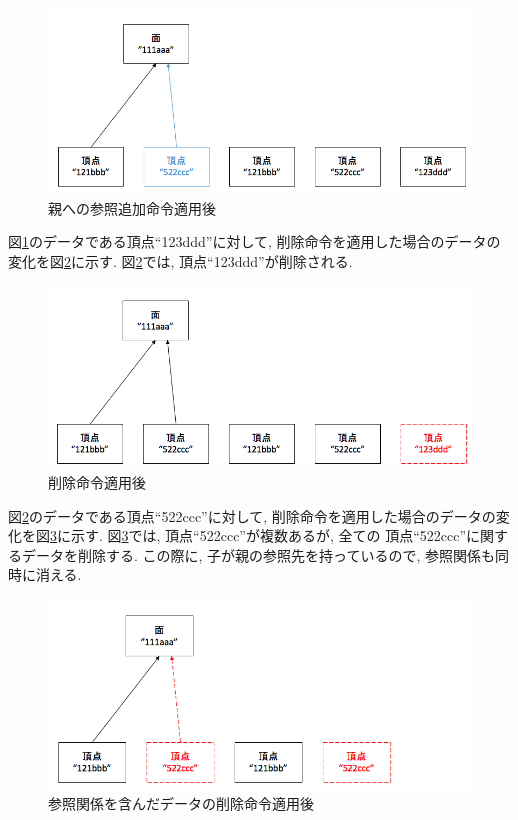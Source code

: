 \begin{figure}[htbp]
  \begin{center}
    \includegraphics[scale=0.45]{images/ope2}
    \caption{親への参照追加命令適用後}
    \label{命令2}
  \end{center}
\end{figure}
図\ref{命令2}のデータである頂点``123ddd''に対して, 削除命令を適用した場合のデータの変化を図\ref{命令3}に示す. 図\ref{命令3}では, 頂点``123ddd''が削除される.
\begin{figure}[htbp]
  \begin{center}
    \includegraphics[scale=0.45]{images/ope3}
    \caption{削除命令適用後}
    \label{命令3}
  \end{center}
\end{figure}
図\ref{命令3}のデータである頂点``522ccc''に対して, 削除命令を適用した場合のデータの変化を図\ref{命令4}に示す. 図\ref{命令4}では, 頂点``522ccc''が複数あるが, 全ての 頂点``522ccc''に関するデータを削除する. この際に, 子が親の参照先を持っているので, 参照関係も同時に消える.
\begin{figure}[htbp]
  \begin{center}
    \includegraphics[scale=0.45]{images/ope4}
    \caption{参照関係を含んだデータの削除命令適用後}
    \label{命令4}
  \end{center}
\end{figure}
